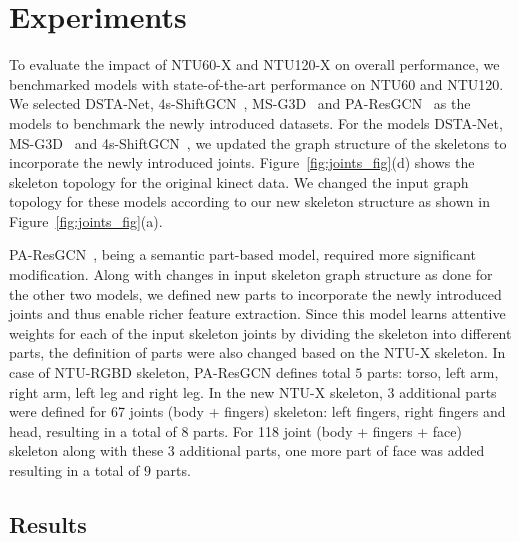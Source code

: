 \documentclass[sigconf,screen,prologue,table,dvipsnames]{acmart}
\begin{document}
\section{Experiments}
\label{sec:experiments}

To evaluate the impact of NTU60-X and NTU120-X on overall performance, we benchmarked models with state-of-the-art performance on NTU60 and NTU120. We selected DSTA-Net\cite{dstanet_accv2020}, 4s-ShiftGCN~\cite{cheng2020shiftgcn}, MS-G3D~\cite{liu2020disentangling} and PA-ResGCN~\cite{song2020stronger} as the models to benchmark the newly introduced datasets. For the models DSTA-Net\cite{dstanet_accv2020}, MS-G3D~\cite{liu2020disentangling} and 4s-ShiftGCN~\cite{cheng2020shiftgcn}, we updated the graph structure of the skeletons to incorporate the newly introduced joints. Figure~\ref{fig:joints_fig}(d) shows the skeleton topology for the original kinect data. We changed the input graph topology for these models according to our new skeleton structure as shown in Figure~\ref{fig:joints_fig}(a).

PA-ResGCN~\cite{song2020stronger}, being a semantic part-based model, required more significant modification. Along with changes in input skeleton graph structure as done for the other two models, we defined new parts to incorporate the newly introduced joints and thus enable richer feature extraction. Since this model learns attentive weights for each of the input skeleton joints by dividing the skeleton into different parts, the definition of parts were also changed based on the NTU-X skeleton. In case of NTU-RGBD skeleton, PA-ResGCN defines total $5$ parts: torso, left arm, right arm, left leg and right leg. In the new NTU-X skeleton, $3$ additional parts were defined for 67 joints (body + fingers) skeleton: left fingers, right fingers and head, resulting in a total of $8$ parts. For 118 joint (body + fingers + face) skeleton along with these $3$ additional parts, one more part of face was added resulting in a total of $9$ parts. 

\subsection{Results}
\label{subsec:results}
\end{document}
